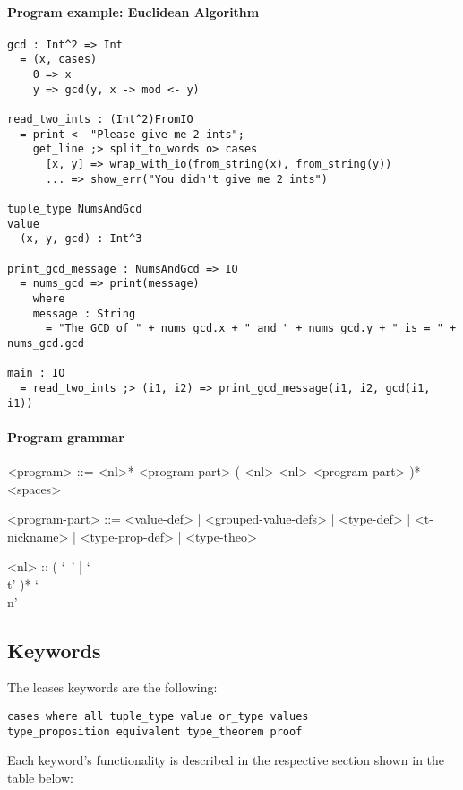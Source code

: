 \documentclass{article}
\begin{document}
\paragraph{Program example: Euclidean Algorithm}
\begin{verbatim}
gcd : Int^2 => Int
  = (x, cases)
    0 => x
    y => gcd(y, x -> mod <- y) 

read_two_ints : (Int^2)FromIO
  = print <- "Please give me 2 ints";
    get_line ;> split_to_words o> cases
      [x, y] => wrap_with_io(from_string(x), from_string(y))
      ... => show_err("You didn't give me 2 ints")
 
tuple_type NumsAndGcd
value
  (x, y, gcd) : Int^3

print_gcd_message : NumsAndGcd => IO
  = nums_gcd => print(message)
    where
    message : String
      = "The GCD of " + nums_gcd.x + " and " + nums_gcd.y + " is = " + nums_gcd.gcd

main : IO
  = read_two_ints ;> (i1, i2) => print_gcd_message(i1, i2, gcd(i1, i1))
\end{verbatim}

\paragraph{Program grammar}
\begin{grammar}
<program> ::=
<nl>* <program-part> ( <nl> <nl> <program-part> )* <spaces>

<program-part> ::=
<value-def> | <grouped-value-defs> | <type-def> | <t-nickname> | <type-prop-def> |
<type-theo>

<nl> :: ( `\ ' | `\\t' )* `\\n'
\end{grammar}

\subsection{Keywords}

The lcases keywords are the following:
\begin{verbatim}
cases where all tuple_type value or_type values
type_proposition equivalent type_theorem proof
\end{verbatim}
Each keyword's functionality is described in the respective section shown in the 
table below:
\end{document}
